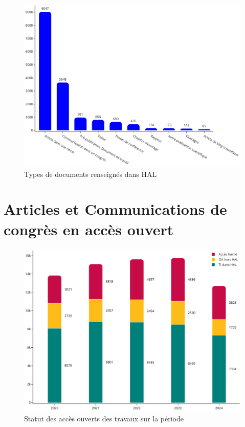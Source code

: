 \documentclass[french, 11pt]{dibiso/biso}
\begin{document}
\begin{figure}[!h]
  \includegraphics[width=\textwidth]{figures/works_type.pdf}
  \centering
  \caption{Types de documents renseignés dans HAL}
  \label{fig_doc_type}
\end{figure}







\pagebreak

\section{Articles et Communications de congrès en accès ouvert} %

\begin{figure}[!h]
  \includegraphics[width=\textwidth]{figures/open_access_works.pdf}
  \caption{Statut des accès ouverts des travaux sur la période {\oaworksperiod}}
  \label{fig_open_access_works}
\end{figure}
\end{document}
